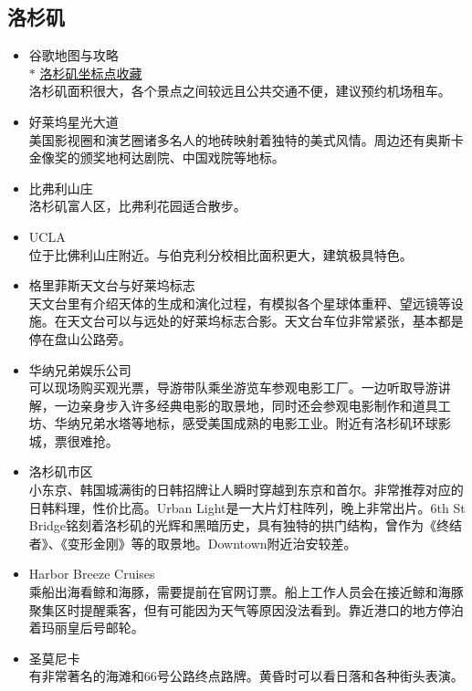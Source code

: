 \subsection{洛杉矶}
    \begin{itemize}
        \item 谷歌地图与攻略 \\
        $\ast$ \href{https://maps.app.goo.gl/9ZG6N5wpqbBRAzxu8}{洛杉矶坐标点收藏} \\
        洛杉矶面积很大，各个景点之间较远且公共交通不便，建议预约机场租车。
        \item 好莱坞星光大道 \\
        美国影视圈和演艺圈诸多名人的地砖映射着独特的美式风情。周边还有奥斯卡金像奖的颁奖地柯达剧院、中国戏院等地标。
        \item 比弗利山庄 \\
        洛杉矶富人区，比弗利花园适合散步。
        \item UCLA \\
        位于比佛利山庄附近。与伯克利分校相比面积更大，建筑极具特色。
        \item 格里菲斯天文台与好莱坞标志 \\
        天文台里有介绍天体的生成和演化过程，有模拟各个星球体重秤、望远镜等设施。在天文台可以与远处的好莱坞标志合影。天文台车位非常紧张，基本都是停在盘山公路旁。
        \item 华纳兄弟娱乐公司 \\
        可以现场购买观光票，导游带队乘坐游览车参观电影工厂。一边听取导游讲解，一边亲身步入许多经典电影的取景地，同时还会参观电影制作和道具工坊、华纳兄弟水塔等地标，感受美国成熟的电影工业。附近有洛杉矶环球影城，票很难抢。
        \item 洛杉矶市区 \\
        小东京、韩国城满街的日韩招牌让人瞬时穿越到东京和首尔。非常推荐对应的日韩料理，性价比高。Urban Light是一大片灯柱阵列，晚上非常出片。6th St Bridge铭刻着洛杉矶的光辉和黑暗历史，具有独特的拱门结构，曾作为《终结者》、《变形金刚》等的取景地。Downtown附近治安较差。
        \item Harbor Breeze Cruises \\
        乘船出海看鲸和海豚，需要提前在官网订票。船上工作人员会在接近鲸和海豚聚集区时提醒乘客，但有可能因为天气等原因没法看到。靠近港口的地方停泊着玛丽皇后号邮轮。
        \item 圣莫尼卡 \\
        有非常著名的海滩和66号公路终点路牌。黄昏时可以看日落和各种街头表演。\\

\end{itemize}
